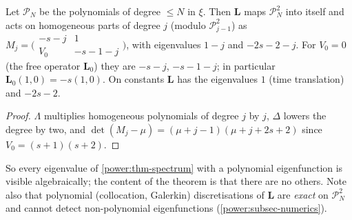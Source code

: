 \begin{lemma}\label{power:lem-poly}
Let $\mathcal P_N$ be the polynomials of degree $\le N$ in $\xi$. Then $\mathbf L$
maps $\mathcal P_N^2$ into itself and acts on homogeneous parts of degree $j$
(modulo $\mathcal P_{j-1}^2$) as
$M_j=\bigl(\begin{smallmatrix}-s-j&1\\ V_0&-s-1-j\end{smallmatrix}\bigr)$, with
eigenvalues $1-j$ and $-2s-2-j$. For $V_0=0$ (the free operator $\mathbf L_0$)
they are $-s-j$, $-s-1-j$; in particular $\mathbf L_0(1,0)=-s(1,0)$. On
constants $\mathbf L$ has the eigenvalues $1$ (time translation) and $-2s-2$.
\end{lemma}
\begin{proof}
$\Lambda$ multiplies homogeneous polynomials of degree $j$ by $j$, $\Delta$
lowers the degree by two, and $\det(M_j-\mu)=(\mu+j-1)(\mu+j+2s+2)$ since
$V_0=(s+1)(s+2)$.
\end{proof}

So every eigenvalue of \cref{power:thm-spectrum} with a polynomial
eigenfunction is visible algebraically; the content of the theorem is that
there are no others. Note also that polynomial (collocation, Galerkin)
discretisations of $\mathbf L$ are \emph{exact} on $\mathcal P_N^2$ and cannot detect
non-polynomial eigenfunctions (\cref{power:subsec-numerics}).

